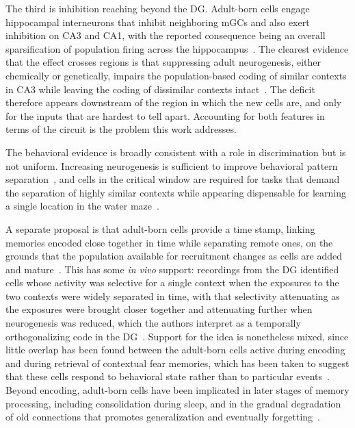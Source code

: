 The third is inhibition reaching beyond the DG\@. Adult-born cells engage hippocampal interneurons that inhibit neighboring mGCs
and also exert inhibition on CA3 and CA1, with the reported consequence being an overall sparsification of population firing
across the hippocampus~\parencite{folszAdultborn2023, mchughAdultborn2022}. The clearest evidence that the effect crosses regions
is that suppressing adult neurogenesis, either chemically or genetically, impairs the population-based coding of similar contexts
in CA3 while leaving the coding of dissimilar contexts intact~\parencite{niiboriSuppression2012}. The deficit therefore appears
downstream of the region in which the new cells are, and only for the inputs that are hardest to tell apart. Accounting for both
features in terms of the circuit is the problem this work addresses.

The behavioral evidence is broadly consistent with a role in discrimination but is not uniform. Increasing neurogenesis is
sufficient to improve behavioral pattern separation~\parencite{sahayIncreasing2011}, and cells in the critical window are
required for tasks that demand the separation of highly similar contexts while appearing dispensable for learning a single
location in the water maze~\parencite{folszAdultborn2023}.

A separate proposal is that adult-born cells provide a time stamp, linking memories encoded close together in time while
separating remote ones, on the grounds that the population available for recruitment changes as cells are added and
mature~\parencite{aimoneComputational2009}. This has some \textit{in vivo} support: recordings from the DG identified cells whose
activity was selective for a single context when the exposures to the two contexts were widely separated in time, with that
selectivity attenuating as the exposures were brought closer together and attenuating further when neurogenesis was reduced, which
the authors interpret as a temporally orthogonalizing code in the DG~\parencite{rangelTemporally2014}. Support for the idea is
nonetheless mixed, since little overlap has been found between the adult-born cells active during encoding and during retrieval of
contextual fear memories, which has been taken to suggest that these cells respond to behavioral state rather than to particular
events~\parencite{folszAdultborn2023}. Beyond encoding, adult-born cells have been implicated in later stages of memory
processing, including consolidation during sleep, and in the gradual degradation of old connections that promotes generalization
and eventually forgetting~\parencite{chavanMemory2025, folszAdultborn2023}.

